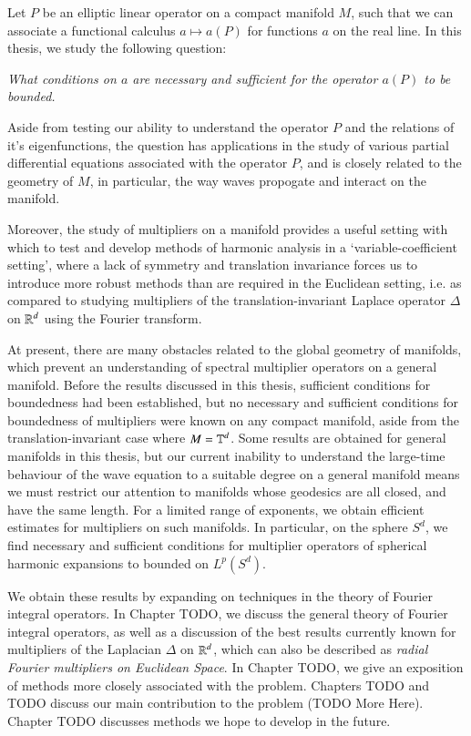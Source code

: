 
Let $P$ be an elliptic linear operator on a compact manifold $M$, such that we can associate a functional calculus $a \mapsto a(P)$ for functions $a$ on the real line. In this thesis, we study the following question:  
%
\begin{changemargin}{2cm}{2cm}
\begin{center}
  \emph{What conditions on $a$ are necessary and sufficient for the operator $a(P)$ to be bounded.}
\end{center}
\end{changemargin}
%
Aside from testing our ability to understand the operator $P$ and the relations of it's eigenfunctions, the question has applications in the study of various partial differential equations associated with the operator $P$, and is closely related to the geometry of $M$, in particular, the way waves propogate and interact on the manifold.

Moreover, the study of multipliers on a manifold provides a useful setting with which to test and develop methods of harmonic analysis in a `variable-coefficient setting', where a lack of symmetry and translation invariance forces us to introduce more robust methods than are required in the Euclidean setting, i.e. as compared to studying multipliers of the translation-invariant Laplace operator $\Delta$ on $\operatorname{\mathbb{R}}^d$ using the Fourier transform.

At present, there are many obstacles related to the global geometry of manifolds, which prevent an understanding of spectral multiplier operators on a general manifold. Before the results discussed in this thesis, sufficient conditions for boundedness had been established, but no necessary and sufficient conditions for boundedness of multipliers were known on any compact manifold, aside from the translation-invariant case where $M = \operatorname{\mathbb{T}}^d$. Some results are obtained for general manifolds in this thesis, but our current inability to understand the large-time behaviour of the wave equation to a suitable degree on a general manifold means we must restrict our attention to manifolds whose geodesics are all closed, and have the same length. For a limited range of exponents, we obtain efficient estimates for multipliers on such manifolds. In particular, on the sphere $S^d$, we find necessary and sufficient conditions for multiplier operators of spherical harmonic expansions to bounded on $L^p(S^d)$.

We obtain these results by expanding on techniques in the theory of Fourier integral operators. In Chapter TODO, we discuss the general theory of Fourier integral operators, as well as a discussion of the best results currently known for multipliers of the Laplacian $\Delta$ on $\operatorname{\mathbb{R}}^d$, which can also be described as \emph{radial Fourier multipliers on Euclidean Space}. In Chapter TODO, we give an exposition of methods more closely associated with the problem. Chapters TODO and TODO discuss our main contribution to the problem (TODO More Here). Chapter TODO discusses methods we hope to develop in the future.